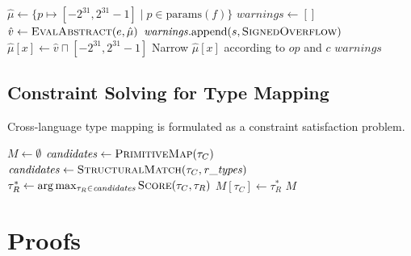 \documentclass[11pt,a4paper]{article}
\begin{document}
\begin{appendices}
\begin{algorithm}[h]
\caption{Interval Abstract Interpretation for Overflow Detection}\label{alg:interval}
\begin{algorithmic}[1]
  \State $\hat{\mu} \gets \{p \mapsto [-2^{31}, 2^{31}-1] \mid p \in \text{params}(f)\}$
  \State $\mathit{warnings} \gets []$
      \State $\hat{v} \gets \Call{EvalAbstract}{e, \hat{\mu}}$
        \State $\mathit{warnings}.\text{append}(s, \textsc{SignedOverflow})$
      \EndIf
      \State $\hat{\mu}[x] \gets \hat{v} \sqcap [-2^{31}, 2^{31}-1]$
      \State Narrow $\hat{\mu}[x]$ according to $op$ and $c$
    \EndIf
  \EndFor
  \State \Return $\mathit{warnings}$
\EndProcedure
\end{algorithmic}
\end{algorithm}

\subsection{Constraint Solving for Type Mapping}\label{app:constraints}

Cross-language type mapping is formulated as a constraint satisfaction
problem.

\begin{algorithm}[h]
\caption{Constraint-Based Type Mapping}\label{alg:typemap}
\begin{algorithmic}[1]
  \State $M \gets \emptyset$
    \State $\mathit{candidates} \gets \Call{PrimitiveMap}{\tau_C}$
      \State $\mathit{candidates} \gets \Call{StructuralMatch}{\tau_C, \mathit{r\_types}}$
    \EndIf
    \State $\tau_R^* \gets \arg\max_{\tau_R \in \mathit{candidates}} \Call{Score}{\tau_C, \tau_R}$
    \State $M[\tau_C] \gets \tau_R^*$
  \EndFor
    \State {}
  \EndIf
  \State \Return $M$
\EndProcedure
\end{algorithmic}
\end{algorithm}


\section{Proofs}\label{app:proofs}


\end{appendices}
\end{document}

